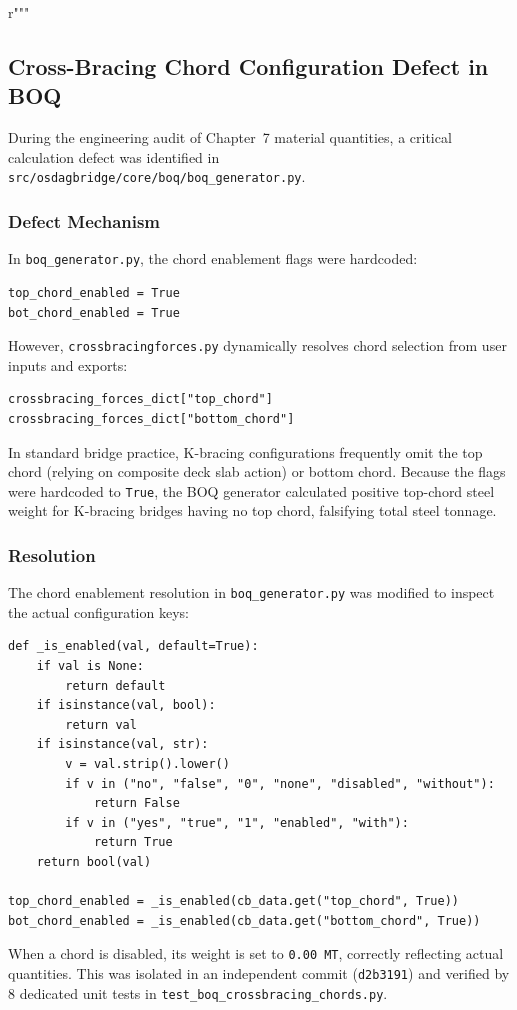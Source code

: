 r"""\documentclass[11pt,a4paper]{article}
\begin{document}
\subsection{Cross-Bracing Chord Configuration Defect in BOQ}
During the engineering audit of Chapter~7 material quantities, a critical calculation defect was identified in \texttt{src/osdagbridge/core/boq/boq_generator.py}.

\subsubsection{Defect Mechanism}
In \texttt{boq_generator.py}, the chord enablement flags were hardcoded:
\begin{verbatim}
top_chord_enabled = True
bot_chord_enabled = True
\end{verbatim}
However, \texttt{crossbracingforces.py} dynamically resolves chord selection from user inputs and exports:
\begin{verbatim}
crossbracing_forces_dict["top_chord"]
crossbracing_forces_dict["bottom_chord"]
\end{verbatim}
In standard bridge practice, K-bracing configurations frequently omit the top chord (relying on composite deck slab action) or bottom chord. Because the flags were hardcoded to \texttt{True}, the BOQ generator calculated positive top-chord steel weight for K-bracing bridges having no top chord, falsifying total steel tonnage.

\subsubsection{Resolution}
The chord enablement resolution in \texttt{boq_generator.py} was modified to inspect the actual configuration keys:
\begin{verbatim}
def _is_enabled(val, default=True):
    if val is None:
        return default
    if isinstance(val, bool):
        return val
    if isinstance(val, str):
        v = val.strip().lower()
        if v in ("no", "false", "0", "none", "disabled", "without"):
            return False
        if v in ("yes", "true", "1", "enabled", "with"):
            return True
    return bool(val)

top_chord_enabled = _is_enabled(cb_data.get("top_chord", True))
bot_chord_enabled = _is_enabled(cb_data.get("bottom_chord", True))
\end{verbatim}
When a chord is disabled, its weight is set to \texttt{0.00 MT}, correctly reflecting actual quantities. This was isolated in an independent commit (\texttt{d2b3191}) and verified by 8 dedicated unit tests in \texttt{test\_boq\_crossbracing\_chords.py}.
\end{document}
